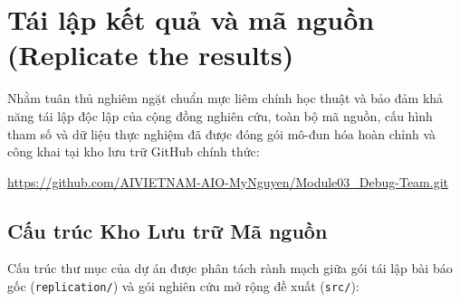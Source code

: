 \section{Tái lập kết quả và mã nguồn (Replicate the results)}
\label{sec:replicate_results}

Nhằm tuân thủ nghiêm ngặt chuẩn mực liêm chính học thuật và bảo đảm khả năng tái lập độc lập của cộng đồng nghiên cứu, toàn bộ mã nguồn, cấu hình tham số và dữ liệu thực nghiệm đã được đóng gói mô-đun hóa hoàn chỉnh và công khai tại kho lưu trữ GitHub chính thức:
\begin{center}
    \url{https://github.com/AIVIETNAM-AIO-MyNguyen/Module03_Debug-Team.git}
\end{center}

\subsection{Cấu trúc Kho Lưu trữ Mã nguồn}
Cấu trúc thư mục của dự án được phân tách rành mạch giữa gói tái lập bài báo gốc (\texttt{replication/}) và gói nghiên cứu mở rộng đề xuất (\texttt{src/}):

